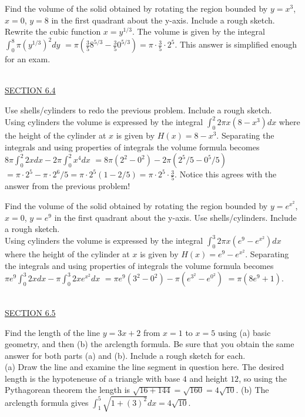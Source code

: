 \documentclass{exam}
\begin{document}
\begin{questions}
\question Find the volume of the solid obtained by rotating the region bounded by $y=x^3$, $x=0$, $y = 8$ in the first quadrant about the y-axis.   Include a rough sketch.
\\ {\color{red} Rewrite the cubic function $x =  y^{1/3}$.  The volume is given by the integral $\displaystyle\int_0^{8} \pi \left( y^{1/3} \right)^2 dy$ $ = \pi \left( \frac{3}{5}8^{5/3} - \frac{3}{5}0^{5/3}   \right) = \pi \cdot \frac{3}{5}\cdot 2^5$. This answer is simplified enough for an exam.}

\ \\
\underline{SECTION 6.4 }

\question Use shells/cylinders to redo the previous problem.     Include a rough sketch.
\\ {\color{red} Using cylinders the volume is expressed by the integral $\displaystyle\int_0^2 2\pi x \left( 8 - x^3 \right)dx$ where the height of the cylinder at $x$ is given by $H(x) = 8 - x^3$.  Separating the integrals and using properties of integrals the volume formula becomes $8\pi  \displaystyle\int_0^2 2x dx  - 2\pi \displaystyle\int_0^2  x^4 dx$ $ = 8\pi  (2^2-0^2)  -2\pi (2^5/5 - 0^5/5)$ $ = \pi \cdot 2^5 - \pi\cdot 2^6/5  = \pi \cdot 2^5 \left( 1-2/5 \right) = \pi \cdot 2^5 \cdot \frac{3}{5}$.  Notice this agrees with the answer from the previous problem!}

\question Find the volume of the solid obtained by rotating the region bounded by $y=e^{x^2}$, $x=0$, $y = e^{9}$ in the first quadrant about the y-axis.  Use shells/cylinders.   Include a rough sketch.
\\ {\color{red} Using cylinders the volume is expressed by the integral $\displaystyle\int_0^3 2\pi x \left( e^9 - e^{x^2}\right)dx$ where the height of the cylinder at $x$ is given by $H(x) = e^9 - e^{x^2}$.  Separating the integrals and using properties of integrals the volume formula becomes $\pi e^9 \displaystyle\int_0^3 2x dx  -\pi \displaystyle\int_0^3  2x e^{x^2} dx$ $ = \pi e^9 (3^2-0^2)  -\pi (e^{3^2}-e^{0^2})$ $ = \pi (8e^9 + 1)$.}

\ \\
\underline{SECTION 6.5} 

\question Find the length of the line $y=3x+2$ from $x=1$ to $x=5$ using (a) basic geometry, and then (b) the arclength formula.  Be sure that you obtain the same answer for both parts (a) and (b).   Include a rough sketch for each.
\\ {\color{red} (a) Draw the line and examine the line segment in question here.  The desired length is the hypoteneuse of a triangle with base $4$ and height $12$, so using the Pythagorean theorem the length is $\sqrt{16+144}=\sqrt{160} = 4\sqrt{10}$.  (b) The arclength formula gives $\displaystyle\int_1^5 \sqrt{1 + (3)^2}dx = 4\sqrt{10}$.  \checkmark }


\end{questions}
\end{document}
